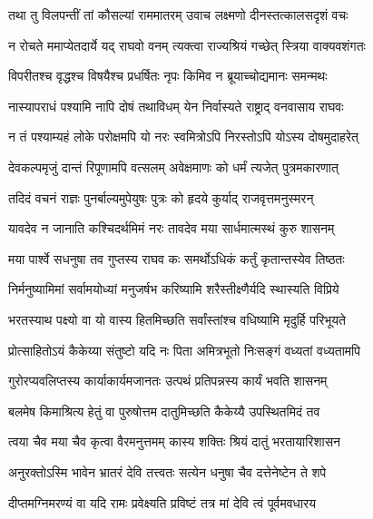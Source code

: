 
\twolineshloka
{तथा तु विलपन्तीं तां कौसल्यां राममातरम्}
{उवाच लक्ष्मणो दीनस्तत्कालसदृशं वचः} %

\twolineshloka
{न रोचते ममाप्येतदार्ये यद् राघवो वनम्}
{त्यक्त्वा राज्यश्रियं गच्छेत् स्त्रिया वाक्यवशंगतः} %

\twolineshloka
{विपरीतश्च वृद्धश्च विषयैश्च प्रधर्षितः}
{नृपः किमिव न ब्रूयाच्चोद्यमानः समन्मथः} %

\twolineshloka
{नास्यापराधं पश्यामि नापि दोषं तथाविधम्}
{येन निर्वास्यते राष्ट्राद् वनवासाय राघवः} %

\twolineshloka
{न तं पश्याम्यहं लोके परोक्षमपि यो नरः}
{स्वमित्रोऽपि निरस्तोऽपि योऽस्य दोषमुदाहरेत्} %

\twolineshloka
{देवकल्पमृजुं दान्तं रिपूणामपि वत्सलम्}
{अवेक्षमाणः को धर्मं त्यजेत् पुत्रमकारणात्} %

\twolineshloka
{तदिदं वचनं राज्ञः पुनर्बाल्यमुपेयुषः}
{पुत्रः को हृदये कुर्याद् राजवृत्तमनुस्मरन्} %

\twolineshloka
{यावदेव न जानाति कश्चिदर्थमिमं नरः}
{तावदेव मया सार्धमात्मस्थं कुरु शासनम्} %

\twolineshloka
{मया पार्श्वे सधनुषा तव गुप्तस्य राघव}
{कः समर्थोऽधिकं कर्तुं कृतान्तस्येव तिष्ठतः} %

\twolineshloka
{निर्मनुष्यामिमां सर्वामयोध्यां मनुजर्षभ}
{करिष्यामि शरैस्तीक्ष्णैर्यदि स्थास्यति विप्रिये} %

\twolineshloka
{भरतस्याथ पक्ष्यो वा यो वास्य हितमिच्छति}
{सर्वांस्तांश्च वधिष्यामि मृदुर्हि परिभूयते} %

\twolineshloka
{प्रोत्साहितोऽयं कैकेय्या संतुष्टो यदि नः पिता}
{अमित्रभूतो निःसङ्गं वध्यतां वध्यतामपि} %

\twolineshloka
{गुरोरप्यवलिप्तस्य कार्याकार्यमजानतः}
{उत्पथं प्रतिपन्नस्य कार्यं भवति शासनम्} %

\twolineshloka
{बलमेष किमाश्रित्य हेतुं वा पुरुषोत्तम}
{दातुमिच्छति कैकेय्यै उपस्थितमिदं तव} %

\twolineshloka
{त्वया चैव मया चैव कृत्वा वैरमनुत्तमम्}
{कास्य शक्तिः श्रियं दातुं भरतायारिशासन} %

\twolineshloka
{अनुरक्तोऽस्मि भावेन भ्रातरं देवि तत्त्वतः}
{सत्येन धनुषा चैव दत्तेनेष्टेन ते शपे} %

\twolineshloka
{दीप्तमग्निमरण्यं वा यदि रामः प्रवेक्ष्यति}
{प्रविष्टं तत्र मां देवि त्वं पूर्वमवधारय} %

